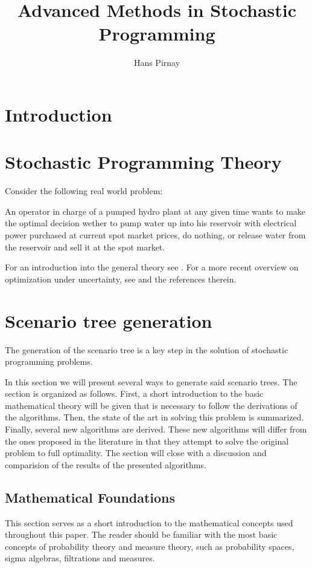 \documentclass[a4paper, 12pt] {article}
\begin{document}
\listoftodos
\newpage
\title{Advanced Methods in Stochastic Programming}
\author{Hans Pirnay}
\maketitle
\tableofcontents
\newpage
\section{Introduction}
\section{Stochastic Programming Theory}
Consider the following real world problem:

An operator in charge of a pumped hydro plant at any given time wants to make the optimal decision wether to pump water up into his reservoir with electrical power purchased at current spot market prices, do nothing, or release water from the reservoir and sell it at the spot market. 

For an introduction into the general theory see \cite{Birge1997}. For a more recent overview on optimization under uncertainty, see \cite{Sahinidis2004} and the references therein.
\section{Scenario tree generation}
The generation of the scenario tree is a key step in the solution of stochastic programming problems.

In this section we will present several ways to generate said scenario trees. The section is organized as follows. First, a short introduction to the basic mathematical theory will be given that is necessary to follow the derivations of the algorithms. Then, the state of the art in solving this problem is summarized. Finally, several new algorithms are derived. These new algorithms will differ from the ones proposed in the literature in that they attempt to solve the original problem to full optimality. The section will close with a discussion and comparision of the results of the presented algorithms. 
\subsection{Mathematical Foundations}
This section serves as a short introduction to the mathematical concepts used throughout this paper. The reader should be familiar with the most basic concepts of probability theory and measure theory, such as probability spaces, sigma algebras, filtrations and measures.
\end{document}
